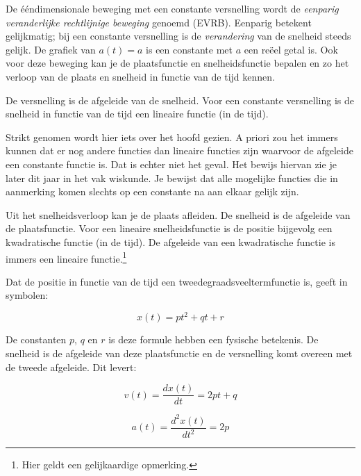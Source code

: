 \documentclass{ximera}
\begin{document}
	\author{Bart Lambregs}
    \xmsource\xmuitleg



De ééndimensionale beweging met een constante  versnelling wordt de \textit{eenparig veranderlijke rechtlijnige beweging} genoemd (EVRB). 
Eenparig betekent gelijkmatig; bij een constante versnelling is de \textit{verandering} van de snelheid steeds gelijk.
De grafiek van $a(t)=a$ is een constante met $a$ een reëel getal is.
Ook voor deze beweging kan je de plaatsfunctie en snelheidsfunctie bepalen en zo het verloop van de plaats en snelheid in functie van de tijd kennen. 


De versnelling is de afgeleide van de snelheid. 
Voor een constante versnelling is de snelheid in functie van de tijd een lineaire functie (in de tijd).


\begin{remark}
Strikt genomen wordt hier iets over het hoofd gezien. 
A priori zou het immers kunnen dat er nog andere functies dan lineaire functies zijn waarvoor de afgeleide een constante functie is. 
Dat is echter niet het geval. 
Het bewijs hiervan zie je later dit jaar in het vak wiskunde. 
Je bewijst dat alle mogelijke functies die in aanmerking komen slechts op een constante na aan elkaar gelijk zijn. 
\end{remark}

Uit het snelheidsverloop kan je de plaats afleiden. 
De snelheid is de afgeleide van de plaatsfunctie. 
Voor een lineaire snelheidsfunctie is de positie bijgevolg een kwadratische functie (in de tijd). 
De afgeleide van een kwadratische functie is immers een lineaire functie.\footnote{Hier geldt een gelijkaardige opmerking.}
	
Dat de positie in functie van de tijd een tweedegraadsveeltermfunctie is, geeft in symbolen: 


\[
x(t)=pt^2+qt+r
\]

De constanten $p$, $q$ en $r$ is deze formule hebben een fysische betekenis. 
De snelheid is de afgeleide van deze plaatsfunctie en de versnelling komt overeen met de tweede afgeleide. Dit levert: 

\[
v(t) =\frac{dx(t)}{dt}=2pt+q
\]

\[
a(t) =\frac{d^2x(t)}{dt^2}=2p
\]
\end{document}
